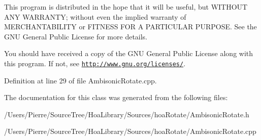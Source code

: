 This program is distributed in the hope that it will be useful, but W\-I\-T\-H\-O\-U\-T A\-N\-Y W\-A\-R\-R\-A\-N\-T\-Y; without even the implied warranty of M\-E\-R\-C\-H\-A\-N\-T\-A\-B\-I\-L\-I\-T\-Y or F\-I\-T\-N\-E\-S\-S F\-O\-R A P\-A\-R\-T\-I\-C\-U\-L\-A\-R P\-U\-R\-P\-O\-S\-E. See the G\-N\-U General Public License for more details.

You should have received a copy of the G\-N\-U General Public License along with this program. If not, see \href{http://www.gnu.org/licenses/}{\tt http\-://www.\-gnu.\-org/licenses/}. 

Definition at line 29 of file Ambisonic\-Rotate.\-cpp.



The documentation for this class was generated from the following files\-:\begin{DoxyCompactItemize}
\item 
/\-Users/\-Pierre/\-Source\-Tree/\-Hoa\-Library/\-Sources/hoa\-Rotate/Ambisonic\-Rotate.\-h\item 
/\-Users/\-Pierre/\-Source\-Tree/\-Hoa\-Library/\-Sources/hoa\-Rotate/Ambisonic\-Rotate.\-cpp\end{DoxyCompactItemize}
